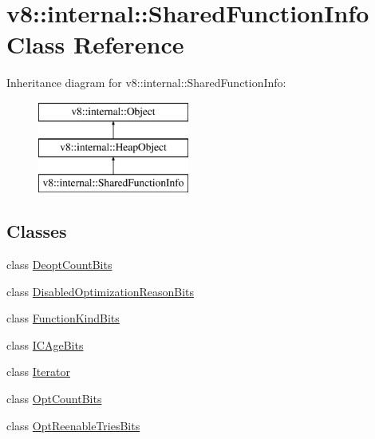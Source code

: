 \hypertarget{classv8_1_1internal_1_1_shared_function_info}{}\section{v8\+:\+:internal\+:\+:Shared\+Function\+Info Class Reference}
\label{classv8_1_1internal_1_1_shared_function_info}
Inheritance diagram for v8\+:\+:internal\+:\+:Shared\+Function\+Info\+:\begin{figure}[H]
\begin{center}
\leavevmode
\includegraphics[height=3.000000cm]{classv8_1_1internal_1_1_shared_function_info}
\end{center}
\end{figure}
\subsection*{Classes}
\begin{DoxyCompactItemize}
\item 
class \hyperlink{classv8_1_1internal_1_1_shared_function_info_1_1_deopt_count_bits}{Deopt\+Count\+Bits}
\item 
class \hyperlink{classv8_1_1internal_1_1_shared_function_info_1_1_disabled_optimization_reason_bits}{Disabled\+Optimization\+Reason\+Bits}
\item 
class \hyperlink{classv8_1_1internal_1_1_shared_function_info_1_1_function_kind_bits}{Function\+Kind\+Bits}
\item 
class \hyperlink{classv8_1_1internal_1_1_shared_function_info_1_1_i_c_age_bits}{I\+C\+Age\+Bits}
\item 
class \hyperlink{classv8_1_1internal_1_1_shared_function_info_1_1_iterator}{Iterator}
\item 
class \hyperlink{classv8_1_1internal_1_1_shared_function_info_1_1_opt_count_bits}{Opt\+Count\+Bits}
\item 
class \hyperlink{classv8_1_1internal_1_1_shared_function_info_1_1_opt_reenable_tries_bits}{Opt\+Reenable\+Tries\+Bits}
\end{DoxyCompactItemize}
